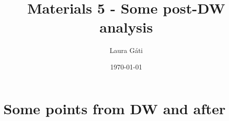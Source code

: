 \documentclass[11pt]{article}
\renewcommand{\[}{\begin{equation}}
\renewcommand{\]}{\end{equation}}
\begin{document}
\linespread{1.0}

\title{Materials 5 - Some post-DW analysis}
\author{Laura G\'ati} 
\date{\today}
\maketitle


\tableofcontents



\section{Some points from DW and after}
\end{document}
